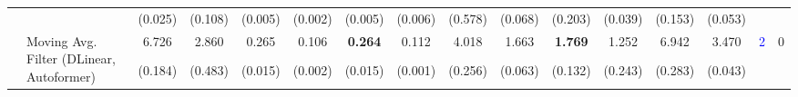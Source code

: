 \begin{table}[ht]
{\begin{tabular}{ll|cc|cc|cc|cc|cc|cc||cc}
                      {} & {} &
                      \small{(0.025)} & 
                      \small{(0.108)} & 
                      \small{(0.005)} & 
                      \small{(0.002)} & 
                      \small{(0.005)} & 
                      \small{(0.006)} & 
                      \small{(0.578)} & 
                      \small{(0.068)} &
                      \small{(0.203)} & 
                      \small{(0.039)} &
                      \small{(0.153)} & 
                      \small{(0.053)} \\
\cline{2-16}
{} & \multirow{2}{*}{Moving Avg. Filter (DLinear, Autoformer)} & 6.726 & 2.860 & 0.265 & 0.106 & \textbf{0.264} & 0.112 & 4.018 & 1.663 & \textbf{1.769} & 1.252 & 6.942 & 3.470 & \multirow{2}{*}{\small{\textcolor{blue}{2}}} & \multirow{2}{*}{\small{0}} \\
                      {} & {} &
                      \small{(0.184)} & 
                      \small{(0.483)} & 
                      \small{(0.015)} & 
                      \small{(0.002)} & 
                      \small{(0.015)} & 
                      \small{(0.001)} & 
                      \small{(0.256)} & 
                      \small{(0.063)} &
                      \small{(0.132)} & 
                      \small{(0.243)} &
                      \small{(0.283)} & 
                      \small{(0.043)} \\
\bottomrule
\end{tabular}
}
\end{table}


